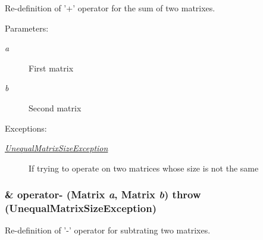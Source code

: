 Re-definition of '+' operator for the sum of two matrixes. 

\begin{Desc}
\item[Parameters:]
\begin{description}
\item[{\em a}]First matrix \item[{\em b}]Second matrix \end{description}
\end{Desc}
\begin{Desc}
\item[Exceptions:]
\begin{description}
\item[{\em \hyperlink{classgrassmann_1_1UnequalMatrixSizeException}{UnequalMatrixSizeException}}]If trying to operate on two matrices whose size is not the same \end{description}
\end{Desc}
\hypertarget{classgrassmann_1_1Matrix_1f3e4394cd1517431ae46632f8540c96}{
\subsubsection[operator-]{\& operator- ({\bf Matrix} {\em a}, \/  {\bf Matrix} {\em b})  throw ({\bf UnequalMatrixSizeException})}}
\label{classgrassmann_1_1Matrix_1f3e4394cd1517431ae46632f8540c96}


Re-definition of '-' operator for subtrating two matrixes. 

